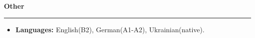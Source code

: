 {
    {\vspace{0.5cm} \hspace{-0.5cm} \Large \textbf{Other}}
    \par\noindent\rule{\textwidth}{0.1mm}

    \begin{itemize}
        \item \textbf{Languages:} English(B2), German(A1-A2), Ukrainian(native).
    \end{itemize}
}
